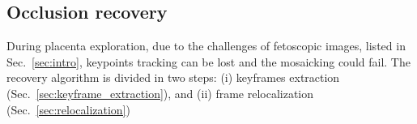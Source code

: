 \documentclass[sn-basic]{sn-jnl}%
\begin{document}


 


\subsection{Occlusion recovery} \label{sec:recovery}
During placenta exploration, due to the challenges of fetoscopic images, listed in Sec.~\ref{sec:intro},  keypoints tracking can be lost and the mosaicking could fail. The recovery algorithm is divided in two steps: (i) keyframes extraction (Sec.~\ref{sec:keyframe_extraction}), and (ii) frame relocalization (Sec.~\ref{sec:relocalization})
\end{document}
